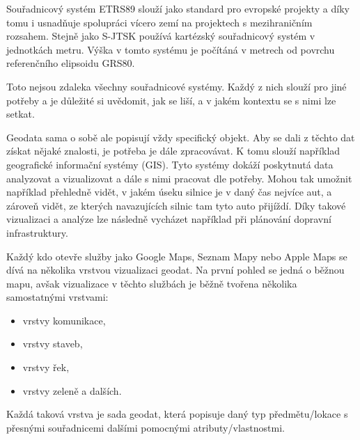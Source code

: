 
Souřadnicový systém ETRS89 slouží jako standard pro evropské projekty a díky tomu i usnadňuje spolupráci vícero zemí na projektech s mezihraničním rozsahem.
Stejně jako S-JTSK používá kartézský souřadnicový systém v jednotkách metru. Výška v tomto systému je počítáná v metrech od povrchu referenčního elipsoidu GRS80.

Toto nejsou zdaleka všechny souřadnicové systémy. Každý z nich slouží pro jiné potřeby a je důležité si uvědomit, jak se liší, a v jakém kontextu se s nimi lze setkat.



Geodata sama o sobě ale popisují vždy specifický objekt. Aby se dali z těchto dat získat nějaké znalosti, je potřeba je dále zpracovávat. K tomu slouží například geografické informační systémy (GIS). Tyto systémy dokáží poskytnutá data analyzovat a vizualizovat a dále s nimi pracovat dle potřeby. Mohou tak umožnit například přehledně vidět, v jakém úseku silnice je v daný čas nejvíce aut, a zároveň vidět, ze kterých navazujících silnic tam tyto auto přijíždí. Díky takové vizualizaci a analýze lze následně vycházet například při plánování dopravní infrastruktury.

Každý kdo otevře služby jako Google Maps, Seznam Mapy nebo Apple Maps se dívá na několika vrstvou vizualizaci geodat. Na první pohled se jedná o běžnou mapu, avšak vizualizace v těchto službách je běžně tvořena několika samostatnými vrstvami:

\begin{itemize}
    \item vrstvy komunikace,
    \item vrstvy staveb,
    \item vrstvy řek,
    \item vrstvy zeleně a dalších.
\end{itemize}

Každá taková vrstva je sada geodat, která popisuje daný typ předmětu/lokace s přesnými souřadnicemi dalšími pomocnými atributy/vlastnostmi.

